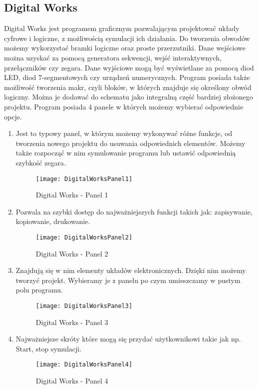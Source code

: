 \documentclass[12pt, a4paper, onside, polish]{article}				%
\begin{document}
\subsection{Digital Works}
\hspace{\parindent}
Digital Works jest programem graficznym pozwalającym projektować układy cyfrowe i logiczne, z możliwością symulacji ich działania. Do tworzenia obwodów możemy wykorzystać bramki logiczne oraz proste przerzutniki. Dane wejściowe można uzyskać za pomocą generatora sekwencji, wejść interaktywnych, przełączników czy zegara. Dane wyjściowe mogą być wyświetlane za pomocą diod LED, diod 7-segmentowych czy urządzeń numerycznych. Program posiada także możliwość tworzenia makr, czyli bloków, w których znajduje się określony obwód logiczny. Można je dodawać do schematu jako integralną część bardziej złożonego projektu.  \newline\newline
Program posiada 4 panele w których możemy wybierać odpowiednie opcje.
 \begin{enumerate}
\item Jest to typowy panel, w którym możemy wykonywać różne funkcje, od tworzenia nowego projektu do usuwania odpowiednich elementów. Możemy także rozpocząć w nim symulowanie programu lub ustawić odpowiednią szybkość zegara. 
  	\begin{figure}[hbt!]
  	  {\centering \texttt{[image: DigitalWorksPanel1]} \caption{Digital Works - Panel 1}}\vspace{5mm}
    	\end{figure}

\item Pozwala na szybki dostęp do najważniejszych funkcji takich jak: zapisywanie, kopiowanie, drukowanie.
	\begin{figure}[hbt!]
  	  {\centering \texttt{[image: DigitalWorksPanel2]} \caption{Digital Works - Panel 2}}\vspace{5mm}
    	\end{figure}

\item Znajdują się w nim elementy układów elektronicznych. Dzięki nim możemy tworzyć projekt. Wybieramy je z panelu po czym umieszczamy w pustym polu programu. 
   	\begin{figure}[hbt!]
  	  {\centering \texttt{[image: DigitalWorksPanel3]} \caption{Digital Works - Panel 3}}\vspace{5mm}
    	\end{figure}

\item Najważniejsze skróty które mogą się przydać użytkownikowi takie jak np. Start, stop symulacji. 
   	\begin{figure}[hbt!]
  	  {\centering \texttt{[image: DigitalWorksPanel4]} \caption{Digital Works - Panel 4}}\vspace{5mm}
    	\end{figure}
\end{enumerate}
\end{document}
